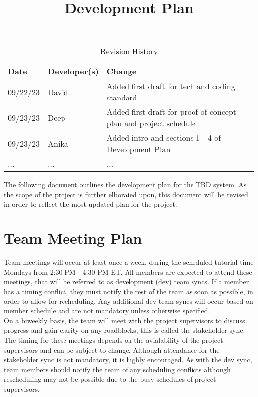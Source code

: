 \documentclass{article}
\title{Development Plan\\\progname}
\author{\authname}
\date{}
\begin{document}
\maketitle

\begin{table}[hp]
\caption{Revision History} \label{TblRevisionHistory}
\begin{tabularx}{\textwidth}{llX}
\toprule
\textbf{Date} & \textbf{Developer(s)} & \textbf{Change}\\
\midrule
09/22/23 & David & Added first draft for tech and coding standard\\
09/23/23 & Deep & Added first draft for proof of concept plan and project schedule\\
09/23/23 & Anika & Added intro and sections 1 - 4 of Development Plan\\
... & ... & ...\\
\bottomrule
\end{tabularx}
\end{table}


\noindent The following document outlines the development plan for the TBD system.
As the scope of the project is further elborated upon, 
this document will be revised in order to reflect the most updated plan for the project.\\


\section{Team Meeting Plan} 
Team meetings will occur at least once a week, during the scheduled tutorial time Mondays from 2:30 PM - 4:30 PM ET.
All members are expected to attend these meetings, that will be referred to as development (dev) team syncs. 
If a member has a timing conflict, they must notify the rest of the team as soon as possible, in order to allow for recheduling.
Any additional dev team syncs will occur based on member schedule and are not mandatory unless otherwise specified.\\

On a biweekly basis, the team will meet with the project supervisors to discuss progress and gain clarity on any roadblocks, this is called the stakeholder sync. 
The timing for these meetings depends on the avialability of the project supervisors and can be subject to change. 
Although attendance for the stakeholder sync is not mandatory, it is highly encouraged. 
As with the dev sync, team members should notify the team of any scheduling conflicts although rescheduling may not be possible due to the busy schedules of project supervisors. \\
\end{document}
